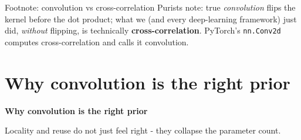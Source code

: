 \documentclass[aspectratio=169]{beamer}
\begin{document}
\begin{frame}{Footnote: convolution vs cross-correlation}
  Purists note: true \emph{convolution} flips the kernel before the dot product; what we
  (and every deep-learning framework) just did, \emph{without} flipping, is technically
  \textbf{cross-correlation}.
  \vskip 8pt
  PyTorch's \texttt{nn.Conv2d} computes cross-correlation and calls it convolution.
  \vskip 8pt
\end{frame}

\section{Why convolution is the right prior}

\begin{frame}[plain]
  \vfill
  \begin{center}
    {\Large\color{popblue}\textbf{Why convolution is the right prior}}\\[0.9em]
    \begin{minipage}{0.82\textwidth}\centering\small
      Locality and reuse do not just feel right - they collapse the parameter count.
    \end{minipage}
  \end{center}
  \vfill
\end{frame}
\end{document}
